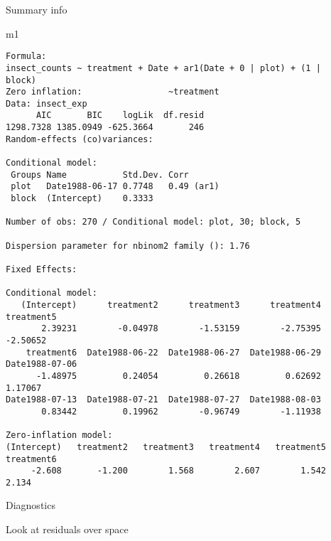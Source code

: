 \documentclass[
  letterpaper,
  DIV=11,
  numbers=noendperiod]{scrreprt}
\newenvironment{Shaded}{\begin{snugshade}}{\end{snugshade}}
\newcommand{\AttributeTok}[1]{\textcolor[rgb]{0.40,0.45,0.13}{#1}}
\newcommand{\DecValTok}[1]{\textcolor[rgb]{0.68,0.00,0.00}{#1}}
\newcommand{\FunctionTok}[1]{\textcolor[rgb]{0.28,0.35,0.67}{#1}}
\newcommand{\NormalTok}[1]{\textcolor[rgb]{0.00,0.23,0.31}{#1}}
\newcommand{\OtherTok}[1]{\textcolor[rgb]{0.00,0.23,0.31}{#1}}
\newcommand{\SpecialCharTok}[1]{\textcolor[rgb]{0.37,0.37,0.37}{#1}}
\begin{document}
Summary info

\begin{Shaded}
\begin{Highlighting}[]
\NormalTok{m1}
\end{Highlighting}
\end{Shaded}

\begin{verbatim}
Formula:          
insect_counts ~ treatment + Date + ar1(Date + 0 | plot) + (1 |      block)
Zero inflation:                 ~treatment
Data: insect_exp
      AIC       BIC    logLik  df.resid 
1298.7328 1385.0949 -625.3664       246 
Random-effects (co)variances:

Conditional model:
 Groups Name           Std.Dev. Corr      
 plot   Date1988-06-17 0.7748   0.49 (ar1)
 block  (Intercept)    0.3333             

Number of obs: 270 / Conditional model: plot, 30; block, 5

Dispersion parameter for nbinom2 family (): 1.76 

Fixed Effects:

Conditional model:
   (Intercept)      treatment2      treatment3      treatment4      treatment5  
       2.39231        -0.04978        -1.53159        -2.75395        -2.50652  
    treatment6  Date1988-06-22  Date1988-06-27  Date1988-06-29  Date1988-07-06  
      -1.48975         0.24054         0.26618         0.62692         1.17067  
Date1988-07-13  Date1988-07-21  Date1988-07-27  Date1988-08-03  
       0.83442         0.19962        -0.96749        -1.11938  

Zero-inflation model:
(Intercept)   treatment2   treatment3   treatment4   treatment5   treatment6  
     -2.608       -1.200        1.568        2.607        1.542        2.134  
\end{verbatim}

Diagnostics

Look at residuals over space

\begin{Shaded}
\end{Shaded}
\end{document}
